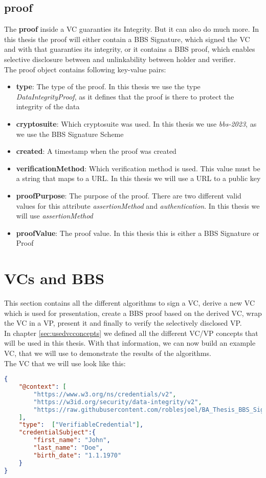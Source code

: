 \documentclass[
	a4paper               %
	,BCOR=0mm            %
	,bibliography=totoc   %
	,listof=totoc         %
	,monolingual
	,twoside=false
]{bfhthesis}              %
\begin{document}
\subsection{proof}
The \textbf{proof} inside a VC guaranties its Integrity. But it can also do much more.
In this thesis the proof will either contain a BBS Signature, which signed the VC and with that guaranties its integrity, or it contains a BBS proof, which enables selective disclosure between and unlinkability between holder and verifier.\\
The proof object contains following key-value pairs:
\begin{itemize}
	\item \textbf{type}: The type of the proof. In this thesis we use the type \textit{DataIntegrityProof}, as it defines that the proof is there to protect the integrity of the data
	\item \textbf{cryptosuite}: Which cryptosuite was used. In this thesis we use \textit{bbs-2023}, as we use the BBS Signature Scheme
	\item \textbf{created}: A timestamp when the proof was created
	\item \textbf{verificationMethod}: Which verification method is used. This value must be a string that maps to a URL. In this thesis we will use a URL to a public key
	\item \textbf{proofPurpose}: The purpose of the proof. There are two different valid values for this attribute \textit{assertionMethod} and \textit{authentication}. In this thesis we will use \textit{assertionMethod}
	\item \textbf{proofValue}: The proof value. In this thesis this is either a BBS Signature or Proof
\end{itemize}

\section{VCs and BBS}
This section contains all the different algorithms to sign a VC, derive a new VC which is used for presentation, create a BBS proof based on the derived VC, wrap the VC in a VP, present it and finally to verify the selectively disclosed VP.\\

In chapter \ref{sec:usedvcconcepts} we defined all the different VC/VP concepts that will be used in this thesis. With that information, we can now build an example VC, that we will use to demonstrate the results of the algorithms.\\
The VC that we will use look like this:
\begin{lstlisting}[language=json,firstnumber=1,caption={Example VC},captionpos=b,label={list:example-vc}]
{
	"@context": [
		"https://www.w3.org/ns/credentials/v2",
		"https://w3id.org/security/data-integrity/v2",
		"https://raw.githubusercontent.com/roblesjoel/BA_Thesis_BBS_Signatures/docs/context/example_1.jsonld"
	],
	"type":  ["VerifiableCredential"],
	"credentialSubject":{
		"first_name": "John",
		"last_name": "Doe",
		"birth_date": "1.1.1970"
	}
}
\end{lstlisting}
\end{document}
